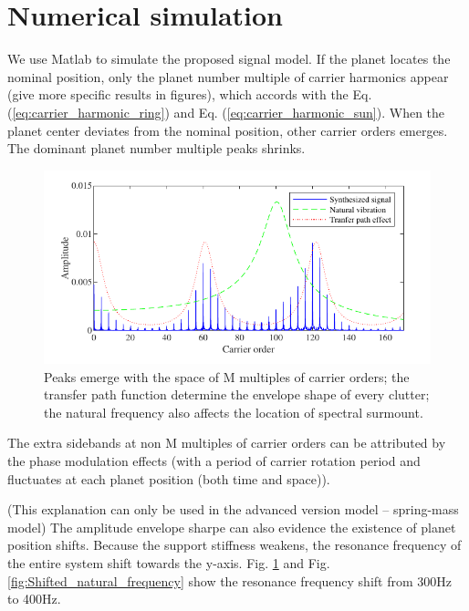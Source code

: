 \documentclass[a4paper,fleqn]{cas-sc}%
\begin{document}
\section{Numerical simulation}
\par We use Matlab to simulate the proposed signal model. If the planet locates the nominal position, only the planet number multiple of carrier harmonics appear (give more specific results in figures), which accords with the Eq. (\ref{eq:carrier_harmonic_ring}) and Eq. (\ref{eq:carrier_harmonic_sun}). When the planet center deviates from the nominal position, other carrier orders emerges.  The dominant planet number multiple peaks shrinks. 
\begin{figure}[pos=htbp]
    \centering
    \includegraphics[scale=1]{overview_normal_fourier.pdf}
    \caption{Peaks emerge with the space of M multiples of carrier orders; the transfer path function determine the envelope shape of every clutter; the natural frequency also affects the location of spectral surmount.}\label{fig:overview_normal_fourier}
\end{figure}
\par The extra sidebands at non M multiples of carrier orders can be attributed by the phase modulation effects (with a period of carrier rotation period and fluctuates at each planet position (both time and space)).
\par (This explanation can only be used in the advanced version model -- spring-mass model) The amplitude envelope sharpe can also evidence the existence of planet position shifts. Because the support stiffness weakens, the resonance frequency of the entire system shift towards the y-axis. Fig. \ref{fig:overview_normal_fourier} and Fig. \ref{fig:Shifted_natural_frequency} show the resonance frequency shift from 300Hz to 400Hz.
\end{document}
